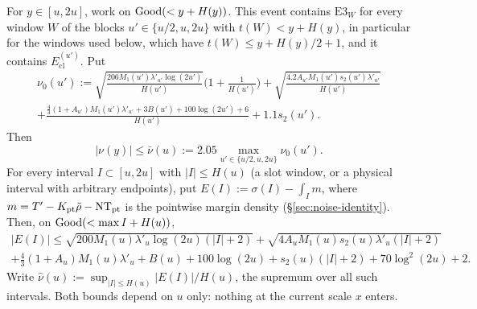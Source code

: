 \begin{lemma}\label{lem:noise}
For $y\in[u,2u]$, work on $\mathrm{Good}(<y+H(y))$. This event contains $\mathrm{E3}_W$ for every window $W$ of the blocks $u'\in\{u/2,u,2u\}$ with
$t(W)<y+H(y)$, in particular for the windows used below, which have $t(W)\le y+H(y)/2+1$, and it contains $E_{\mathrm{cl}}^{(u')}$.
Put
\begin{multline*}
  \nu_0(u'):=\sqrt{\frac{206M_1(u')\lambda'_{u'}\log(2u')}{H(u')}}\Big(1+\frac1{H(u')}\Big)
  +\sqrt{\frac{4.2A_{u'}M_1(u')s_2(u')\lambda'_{u'}}{H(u')}}\\
  +\frac{\frac43(1+A_{u'})M_1(u')\lambda'_{u'}+3B(u')+100\log(2u')+6}{H(u')}+1.1s_2(u').
\end{multline*}
Then
\[
  |\nu(y)|\le\bar\nu(u):=2.05\max_{u'\in\{u/2,u,2u\}}\nu_0(u').
\]
For every interval $I\subset[u,2u]$ with $|I|\le H(u)$ (a slot window, or a physical interval with arbitrary endpoints), put
$E(I):=\sigma(I)-\int_Im$, where $m=T'-K_{\mathrm{pt}}\tilde\rho-\mathrm{NT}_{\mathrm{pt}}$ is the pointwise margin density (\S\ref{sec:noise-identity}). Then,
on $\mathrm{Good}(<\max I+H(u))$,
\begin{multline*}
  |E(I)|\le\sqrt{200M_1(u)\lambda'_u\log(2u)(|I|+2)}+\sqrt{4A_uM_1(u)s_2(u)\lambda'_u(|I|+2)}\\
  +\tfrac43(1+A_u)M_1(u)\lambda'_u+B(u)+100\log(2u)+s_2(u)(|I|+2)+70\log^2(2u)+2 .
\end{multline*}
Write $\hat\nu(u):=\sup_{|I|\le H(u)}|E(I)|/H(u)$, the supremum over all such intervals. Both bounds depend on $u$ only: nothing at the current scale $x$
enters.
\end{lemma}

